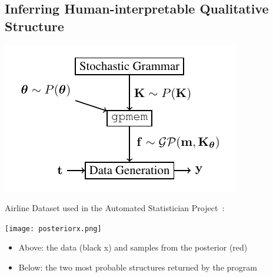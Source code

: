 \documentclass[a0,portrait]{a0poster}
\begin{document}
\begin{multicols}{3}
\subsection*{Inferring Human-interpretable Qualitative Structure}
\begin{center}
\includegraphics[width=0.8\linewidth]{schematic.pdf}
\end{center}



Airline Dataset used in the Automated Statistician Project~\cite{duvenaud2013structure}:
\begin{center}
\texttt{[image: posteriorx.png]}
\end{center}
\begin{itemize}
\item Above: the data (black x) and samples from the posterior (red)
\item Below: the two most probable structures returned by the program
\end{itemize}



 \begin{center} 
\begin{tabular}{m{12cm} m{12cm}}


\end{tabular}
\end{center}
\end{multicols}
\end{document}
